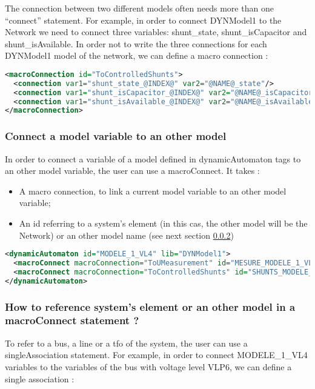 \documentclass[a4paper, 12pt]{report}
\begin{document}
The connection between two different models often needs more than one ``connect'' statement. For example, in order to connect DYNModel1 to the Network we need to connect three variables: shunt\_state, shunt\_isCapacitor and shunt\_isAvailable.
In order not to write the three connections for each DYNModel1 model of the network, we can define a macro connection :
\begin{lstlisting}[language=XML, morekeywords={macroConnection}]
<macroConnection id="ToControlledShunts">
  <connection var1="shunt_state_@INDEX@" var2="@NAME@_state"/>
  <connection var1="shunt_isCapacitor_@INDEX@" var2="@NAME@_isCapacitor"/>
  <connection var1="shunt_isAvailable_@INDEX@" var2="@NAME@_isAvailable"/>
</macroConnection>
\end{lstlisting}

\subsubsection{Connect a model variable to an other model}

In order to connect a variable of a model defined in dynamicAutomaton tags to an other model variable, the user can use a macroConnect. It takes :
\begin{itemize}
  \item A macro connection, to link a current model variable to an other model variable;
  \item An id referring to a system's element (in this cas, the other model will be the Network) or an other model name (see next section \ref{Node_Or_Model_Reference_On_Macro_Connect})
\end{itemize}

\begin{lstlisting}[language=XML, morekeywords={macroConnect}]
<dynamicAutomaton id="MODELE_1_VL4" lib="DYNModel1">
  <macroConnect macroConnection="ToUMeasurement" id="MESURE_MODELE_1_VL4"/>
  <macroConnect macroConnection="ToControlledShunts" id="SHUNTS_MODELE_1_VL4"/>
</dynamicAutomaton>
\end{lstlisting}

\subsubsection{How to reference system's element or an other model in a macroConnect statement ?}
\label{Node_Or_Model_Reference_On_Macro_Connect}

To refer to a bus, a line or a tfo of the system, the user can use a singleAssociation statement. For example, in order to connect MODELE\_1\_VL4 variables to the variables of
the bus with voltage level VLP6, we can define a single association :
\end{document}

